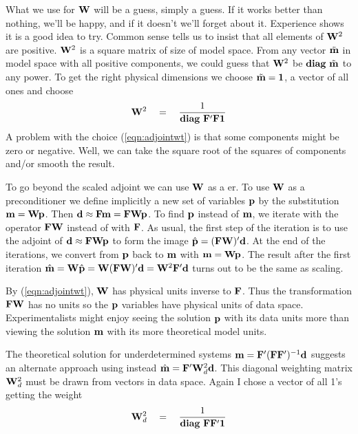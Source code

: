 \par
What we use for $\bold W$ will be a guess, simply a guess.
If it works better than nothing, we'll be happy,
and if it doesn't we'll forget about it.
Experience shows it is a good idea to try.
Common sense tells us to insist that all elements of $\bold W^2$ are positive.
$\bold W^2$ is a square matrix of size of model space.
From any vector $\tilde {\bold m}$ in model space with all positive components,
we could guess that $\bold W^2$ be
${\bf diag\ } \tilde {\bold m}$ to any power.
To get the right physical dimensions we choose
$\tilde {\bold m}=\bold 1$, a vector of all ones and choose
\begin{equation}
\bold W^2 \quad =\quad
	{
		1
			\over
		{\bf diag\ } {\bold F'\bold F\bold 1}
	}
\label{eqn:adjointwt}
\end{equation}
A problem with the choice
(\ref{eqn:adjointwt}) is that some components might be zero or negative.
Well, we can take the square root of the squares of components
and/or smooth the result.

\par
To go beyond the scaled adjoint we can use $\bold W$ as a er.
To use $\bold W$ as a preconditioner
we define implicitly a new set of variables $\bold p$
by the substitution $\bold m=\bold W\bold p$.
Then $\bold d \approx \bold F\bold m=\bold F\bold W\bold p$.
To find $\bold p$ instead of $\bold m$,
we iterate
with the operator $\bold  F\bold W$ instead of with $\bold F$.
As usual, the first step of the iteration is to use the adjoint
of $\bold d\approx \bold F\bold W\bold p$ to form the image
$\hat{\bold p}=(\bold F\bold W)'\bold d$.
At the end of the iterations,
we convert from  $\bold p$ back to  $\bold m$
with $\bold m=\bold W\bold p$.
The result after the first iteration
$\hat{\bold m}=\bold W\hat{\bold p}=\bold W(\bold F\bold W)'\bold d=\bold W^2\bold F'\bold d$
turns out to be the same as scaling.
\par
By (\ref{eqn:adjointwt}), $\bold W$ has physical units inverse to $\bold F$.
Thus the transformation $\bold F\bold W$ has no units
so the $\bold p$ variables have physical units of data space.
Experimentalists might enjoy seeing the 
solution $\bold p$
with its data units more than viewing the solution $\bold m$
with its more theoretical model units.

\par
The theoretical solution for underdetermined systems
         $\bold m =\bold F' (\bold F \bold F')^{-1} \bold d$
suggests
an alternate approach using instead
         $\hat{\bold m} =\bold F' \bold W_d^2 \bold d$.
This diagonal weighting matrix $\bold W_d^2$ must be drawn
from vectors in data space.
Again I chose a vector of all 1's getting the weight
\begin{equation}
\bold W_d^2 \quad =\quad
	{
		1
			\over
		{\bf diag\ } {\bold F\bold F'\bold 1}
	}
\label{eqn:datawtadjoint}
\end{equation}


